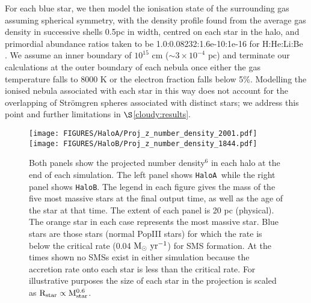 \documentclass[twocolumn,iop,revtex4]{openjournal}
\newcommand{\msolaryrc} {$\rm{M_{\odot}~yr^{-1}}$}
\newcommand{\ha} {\texttt{HaloA~}}
\newcommand{\hbc} {\texttt{HaloB}}
\begin{document}
For each blue star, we then model the ionisation state of the surrounding gas assuming spherical
symmetry, with the density profile found from the average gas density in successive shells 0.5pc
in width, centred on each star in the halo, and primordial abundance ratios taken to be
1.0:0.08232:1.6e-10:1e-16 for H:He:Li:Be \citep[consistent with the results of the][table 2, see
  {\sc cloudy} documentation for further discussion]{Planck_2014}. We assume an inner boundary
of $10^{15}$ cm ($\sim 3 \times 10^{-4}$ pc) and terminate our calculations at the outer boundary of
each nebula once either the gas temperature falls to 8000 K or the electron fraction falls below 5\%.
Modelling the ionised nebula associated with each star in this way does not account for the
overlapping of Str{\"o}mgren spheres associated with distinct stars; we address this point and
further limitations in $\S$\ref{cloudy:results}.
\begin{figure*}
\centering
\begin{minipage}{175mm}      \begin{center} 
\centerline{
\texttt{[image: FIGURES/HaloA/Proj\_z\_number\_density\_2001.pdf]}
\texttt{[image: FIGURES/HaloB/Proj\_z\_number\_density\_1844.pdf]}}
\caption{Both panels show the projected number density$^6$ in each halo at the end of each
  simulation. The left panel shows \ha while the right panel shows \hbc.
  The legend in each figure gives the mass of the five most massive stars at the final output
  time, as well as
  the age of the star at that time. The extent of each panel is 20 pc (physical). The orange
  star in each case represents the most massive star. Blue stars are those stars
  (normal PopIII stars) for which the rate is below the critical rate (0.04 \msolaryrc) for
  SMS formation. At the times shown no
  SMSs exist in either simulation because the accretion rate onto each star is less than the
  critical rate.  For illustrative purposes the size of each star in the
  projection is scaled as $\rm{R_{star}} \propto \rm{M_{star}^{0.6}}$.}  \label{Fig:ProjectionEnd}
\end{center} \end{minipage}

\end{figure*}
\end{document}
